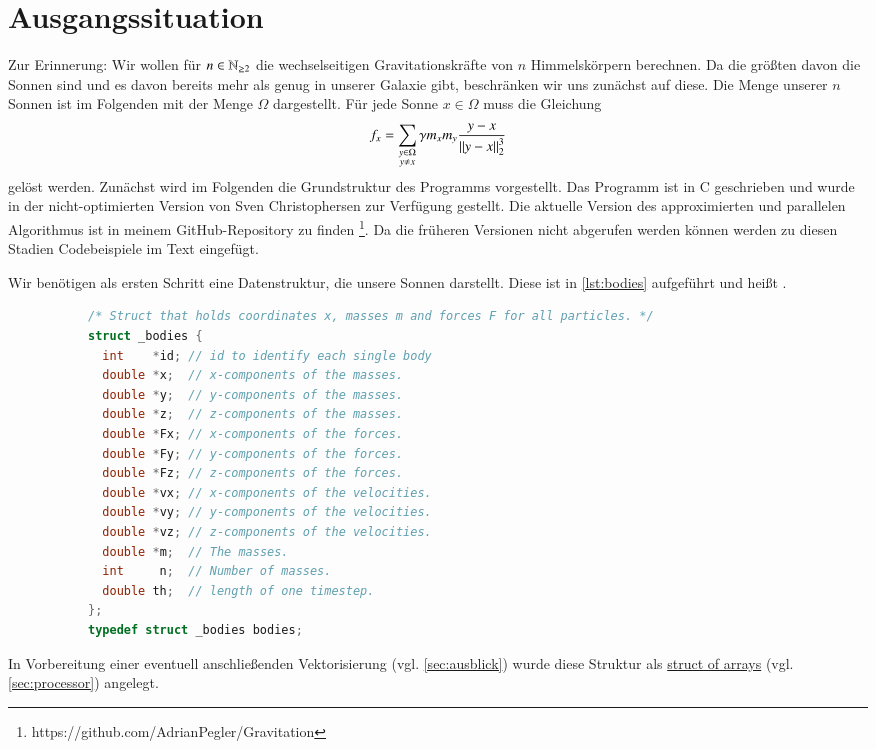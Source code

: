   \section{Ausgangssituation}
   \label{sec:ausgang}
    Zur Erinnerung: Wir wollen für $n \in \mathbb{N}_{\geq 2}$ die wechselseitigen Gravitationskräfte von $n$ Himmelskörpern berechnen. Da die größten davon die Sonnen sind und es davon bereits mehr als
    genug in unserer Galaxie gibt, beschränken wir uns zunächst auf diese. Die Menge unserer $n$ Sonnen ist im Folgenden mit der Menge $\Omega$ dargestellt. Für jede Sonne
    $x \in \Omega$ muss die Gleichung
    \begin{equation}
      f_x = \sum_{\substack{y \in \Omega \\ y \neq x}} \gamma m_x  m_y \frac{y - x}{\left\lVert y - x\right\rVert^3_2}
      \label{eq:sum_grav2}
    \end{equation}
    gelöst werden. Zunächst wird im Folgenden die Grundstruktur des Programms vorgestellt. Das Programm ist in C geschrieben und wurde in der nicht-optimierten Version von Sven 
    Christophersen zur Verfügung gestellt. Die aktuelle Version des approximierten und parallelen Algorithmus ist in meinem GitHub-Repository zu finden
    \footnote{https://github.com/AdrianPegler/Gravitation}. Da die früheren Versionen nicht abgerufen werden können werden zu diesen Stadien Codebeispiele im Text eingefügt.
    
    Wir benötigen als ersten Schritt eine Datenstruktur, die unsere Sonnen darstellt. Diese ist in \autoref{lst:bodies} aufgeführt und heißt .
    \begin{figure}[tb]
    \centering
    \begin{subfigure}{0.9 \textwidth}
    \begin{lstlisting}[language=C, label=lst:bodies, caption={Die Struktur \code{bodies} dient der Speicherung aller mit den einzelnen Sonnen zusammenhängenden Daten.}, numbers=none]
/* Struct that holds coordinates x, masses m and forces F for all particles. */
struct _bodies {
  int    *id; // id to identify each single body
  double *x;  // x-components of the masses.
  double *y;  // y-components of the masses.
  double *z;  // z-components of the masses.
  double *Fx; // x-components of the forces.
  double *Fy; // y-components of the forces.
  double *Fz; // z-components of the forces.
  double *vx; // x-components of the velocities.
  double *vy; // y-components of the velocities.
  double *vz; // z-components of the velocities.
  double *m;  // The masses.
  int     n;  // Number of masses.
  double th;  // length of one timestep.
};
typedef struct _bodies bodies;
    \end{lstlisting}
    \end{subfigure}
    \end{figure}
    In Vorbereitung einer eventuell anschließenden Vektorisierung (vgl. \autoref{sec:ausblick}) wurde diese Struktur als \hyperref[w:aos]{struct of arrays} (vgl. \autoref{sec:processor}) 
    angelegt.
    
